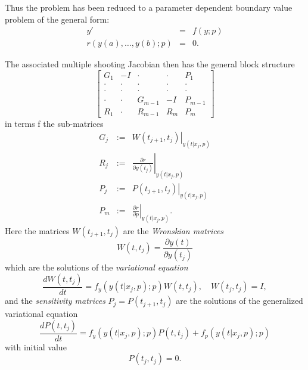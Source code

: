 \documentclass[12pt,a4paper]{article}
\begin{document}
Thus the problem has been reduced to a parameter dependent boundary
value problem of the general form:
\begin{eqnarray}
  y' &=& f(y;p) \\
  r(y(a),\ldots{},y(b);p) &=& 0.
\end{eqnarray}

The associated multiple shooting Jacobian then has the general block
structure
\begin{equation}
  \left[
    \begin{array}{cccccc}
      G_{1} & - I & \cdot & \cdot & P_{1} \\
      \cdot & \cdot & \cdot & \cdot & \cdot \\
      \cdot & \cdot & \cdot & \cdot & \cdot \\
      \cdot & \cdot & G_{m-1} & -I & P_{m-1} \\
      R_{1} & \cdot & R_{m-1} & R_{m} & P_{m}
    \end{array}
  \right] \label{Jacobian}
\end{equation}
in terms f the sub-matrices
\begin{eqnarray}
  G_{j} &:=& \left. W(t_{j+1},t_{j}) \right|_{y(t|x_{j},p)} \nonumber \\
  R_{j} &:=& \left. \frac{\partial r}{\partial y(t_{j})} \right|_{y(t|x_{j},p)} \nonumber \\
  P_{j} &:=& \left. P(t_{j+1},t_{j}) \right|_{y(t|x_{j},p)} \\
  P_{m} &:=& \left. \frac{\partial r}{\partial p} \right|_{y(t|x_{j},p)} \nonumber.
\end{eqnarray}
Here the matrices $W(t_{j+1},t_{j})$ are the {\em Wronskian matrices}
\begin{equation}
  W(t,t_{j}) = \frac{\partial y(t)}{\partial y(t_{j})}
\end{equation}
which are the solutions of the {\em variational equation}
\begin{equation}
  \frac{dW(t,t_{j})}{dt} = f_{y}(y(t|x_{j},p);p) W(t,t_{j}),\quad W(t_{j},t_{j}) = I,
\end{equation}
and the {\em sensitivity matrices\/} $P_{j} = P(t_{j+1},t_{j})$ are
the solutions of the generalized variational equation
\begin{equation}
  \frac{dP(t,t_{j})}{dt} = f_{y}(y(t|x_{j},p);p) P(t,t_{j}) + f_{p}(y(t|x_{j},p);p)
\end{equation}
with initial value
\begin{equation}
  P(t_{j},t_{j}) = 0.
\end{equation}
\end{document}
